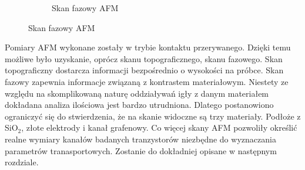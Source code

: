 \begin{figure}[ht]
\begin{subfigure}[b]{0.48\textwidth}
                \caption{Skan fazowy AFM}
                \label{fig:AFMCVDkanalfaza}
        \end{subfigure}
\end{figure}

Pomiary AFM wykonane zostały w trybie kontaktu przerywanego. Dzięki temu możliwe było uzyskanie, oprócz
skanu topograficznego, skanu fazowego. Skan topograficzny dostarcza informacji bezpośrednio o wysokości na próbce.
Skan fazowy zapewnia informacje związaną z kontrastem materiałowym. Niestety ze względu na skomplikowaną naturę 
oddziaływań igły z danym materiałem dokładana analiza ilościowa jest bardzo utrudniona. Dlatego postanowiono
ograniczyć się do stwierdzenia, że na skanie widoczne są trzy materiały. Podłoże z SiO$_2$, złote elektrody i 
kanał grafenowy. Co więcej skany AFM pozwoliły określić realne wymiary kanałów badanych tranzystorów 
niezbędne do wyznaczania parametrów tranasportowych. Zostanie do dokładniej opisane w następnym rozdziale.

